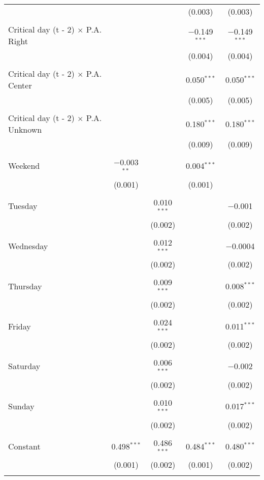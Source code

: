 \documentclass[
]{article}
\begin{document}
\begin{table}[!htbp]
{\begin{tabular}{@{\extracolsep{5pt}}lcccc}
  &  &  & (0.003) & (0.003) \\ 
  & & & & \\ 
 Critical day (t - 2) $\times$ P.A. Right &  &  & $-$0.149$^{***}$ & $-$0.149$^{***}$ \\ 
  &  &  & (0.004) & (0.004) \\ 
  & & & & \\ 
 Critical day (t - 2) $\times$ P.A. Center &  &  & 0.050$^{***}$ & 0.050$^{***}$ \\ 
  &  &  & (0.005) & (0.005) \\ 
  & & & & \\ 
 Critical day (t - 2) $\times$ P.A. Unknown &  &  & 0.180$^{***}$ & 0.180$^{***}$ \\ 
  &  &  & (0.009) & (0.009) \\ 
  & & & & \\ 
 Weekend & $-$0.003$^{**}$ &  & 0.004$^{***}$ &  \\ 
  & (0.001) &  & (0.001) &  \\ 
  & & & & \\ 
 Tuesday &  & 0.010$^{***}$ &  & $-$0.001 \\ 
  &  & (0.002) &  & (0.002) \\ 
  & & & & \\ 
 Wednesday &  & 0.012$^{***}$ &  & $-$0.0004 \\ 
  &  & (0.002) &  & (0.002) \\ 
  & & & & \\ 
 Thursday &  & 0.009$^{***}$ &  & 0.008$^{***}$ \\ 
  &  & (0.002) &  & (0.002) \\ 
  & & & & \\ 
 Friday &  & 0.024$^{***}$ &  & 0.011$^{***}$ \\ 
  &  & (0.002) &  & (0.002) \\ 
  & & & & \\ 
 Saturday &  & 0.006$^{***}$ &  & $-$0.002 \\ 
  &  & (0.002) &  & (0.002) \\ 
  & & & & \\ 
 Sunday &  & 0.010$^{***}$ &  & 0.017$^{***}$ \\ 
  &  & (0.002) &  & (0.002) \\ 
  & & & & \\ 
 Constant & 0.498$^{***}$ & 0.486$^{***}$ & 0.484$^{***}$ & 0.480$^{***}$ \\ 
  & (0.001) & (0.002) & (0.001) & (0.002) \\ 
  & & & & \\ 

\end{tabular}}
\end{table}
\end{document}
